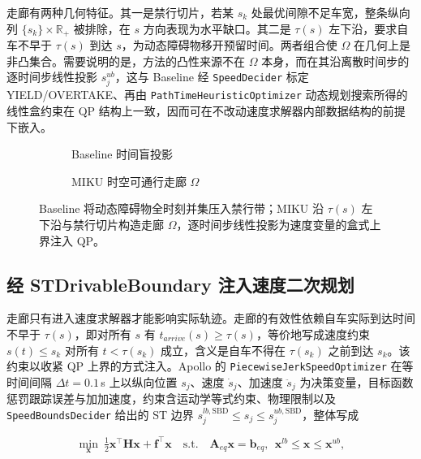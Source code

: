 \documentclass[a4paper,11pt]{ctexart}
\theoremstyle{definition}
\begin{document}
走廊有两种几何特征。其一是禁行切片，若某 $s_k$ 处最优间隙不足车宽，整条纵向列 $\{s_k\}\times\mathbb{R}_{+}$ 被排除，在 $s$ 方向表现为水平缺口。其二是 $\tau(s)$ 左下沿，要求自车不早于 $\tau(s)$ 到达 $s$，为动态障碍物移开预留时间。两者组合使 $\Omega$ 在几何上是非凸集合。需要说明的是，方法的凸性来源不在 $\Omega$ 本身，而在其沿离散时间步的逐时间步线性投影 $s_j^{ub}$，这与 Baseline 经 \texttt{SpeedDecider} 标定 YIELD/OVERTAKE、再由 \texttt{PathTimeHeuristicOptimizer} 动态规划搜索所得的线性盒约束在 QP 结构上一致，因而可在不改动速度求解器内部数据结构的前提下嵌入。

\begin{figure}[htbp]
\centering
\begin{subfigure}[b]{0.46\textwidth}
  \centering
  \caption{Baseline 时间盲投影}
\end{subfigure}\hfill
\begin{subfigure}[b]{0.46\textwidth}
  \centering
  \caption{MIKU 时空可通行走廊 $\Omega$}
\end{subfigure}
\caption{ST 平面上的时空可通行走廊与上界收紧}
\caption*{Baseline 将动态障碍物全时刻并集压入禁行带；MIKU 沿 $\tau(s)$ 左下沿与禁行切片构造走廊 $\Omega$，逐时间步线性投影为速度变量的盒式上界注入 QP。}
\label{fig:corridor}
\end{figure}

\subsection{经 STDrivableBoundary 注入速度二次规划}
\label{sec:method_inject}

走廊只有进入速度求解器才能影响实际轨迹。走廊的有效性依赖自车实际到达时间不早于 $\tau(s)$，即对所有 $s$ 有 $t_{arrive}(s)\geq\tau(s)$，等价地写成速度约束 $s(t)\leq s_k$ 对所有 $t<\tau(s_k)$ 成立，含义是自车不得在 $\tau(s_k)$ 之前到达 $s_k$。该约束以收紧 QP 上界的方式注入。Apollo 的 \texttt{PiecewiseJerkSpeedOptimizer} 在等时间间隔 $\Delta t = 0.1$\,s 上以纵向位置 $s_j$、速度 $\dot{s}_j$、加速度 $\ddot{s}_j$ 为决策变量，目标函数惩罚跟踪误差与加加速度，约束含运动学等式约束、物理限制以及 \texttt{SpeedBoundsDecider} 给出的 ST 边界 $s_j^{lb,\mathrm{SBD}} \leq s_j \leq s_j^{ub,\mathrm{SBD}}$，整体写成

\begin{equation}
    \min_{\mathbf{x}}\ \tfrac{1}{2}\mathbf{x}^{\top}\mathbf{H}\mathbf{x} + \mathbf{f}^{\top}\mathbf{x}
    \quad \text{s.t.}\quad \mathbf{A}_{eq}\mathbf{x} = \mathbf{b}_{eq},\ \ \mathbf{x}^{lb} \leq \mathbf{x} \leq \mathbf{x}^{ub},
    \label{eq:qp_compact}
\end{equation}
\end{document}
